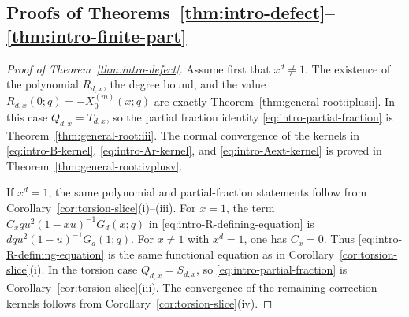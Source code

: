 \documentclass[12pt]{amsart}
\numberwithin{equation}{section}
\begin{document}
\subsection*{Proofs of Theorems~\ref{thm:intro-defect}--\ref{thm:intro-finite-part}}

\begin{proof}[Proof of Theorem~\ref{thm:intro-defect}]
Assume first that \(x^d\neq1\).  The existence of the polynomial
\(R_{d,x}\), the degree bound, and the value \(R_{d,x}(0;q)=-X_0^{(m)}(x;q)\)
are exactly Theorem~\ref{thm:general-root:iplusii}.  In this case
\(Q_{d,x}=T_{d,x}\), so the partial fraction identity
\eqref{eq:intro-partial-fraction} is Theorem~\ref{thm:general-root:iii}.
The normal convergence of the kernels in \eqref{eq:intro-B-kernel},
\eqref{eq:intro-Ar-kernel}, and \eqref{eq:intro-Aext-kernel} is proved in
Theorem~\ref{thm:general-root:ivplusv}.

If \(x^d=1\), the same polynomial and partial-fraction statements follow from
Corollary~\ref{cor:torsion-slice}\textnormal{(i)--(iii)}.  For \(x=1\), the
term
\(C_xq u^2(1-xu)^{-1}G_d(x;q)\) in \eqref{eq:intro-R-defining-equation} is
\(dqu^2(1-u)^{-1}G_d(1;q)\).  For \(x\neq1\) with \(x^d=1\), one has
\(C_x=0\).  Thus \eqref{eq:intro-R-defining-equation} is the same functional
equation as in Corollary~\ref{cor:torsion-slice}\textnormal{(i)}.  In the
torsion case \(Q_{d,x}=S_{d,x}\), so \eqref{eq:intro-partial-fraction} is
Corollary~\ref{cor:torsion-slice}\textnormal{(iii)}.  The convergence of the
remaining correction kernels follows from
Corollary~\ref{cor:torsion-slice}\textnormal{(iv)}.
\end{proof}
\end{document}
